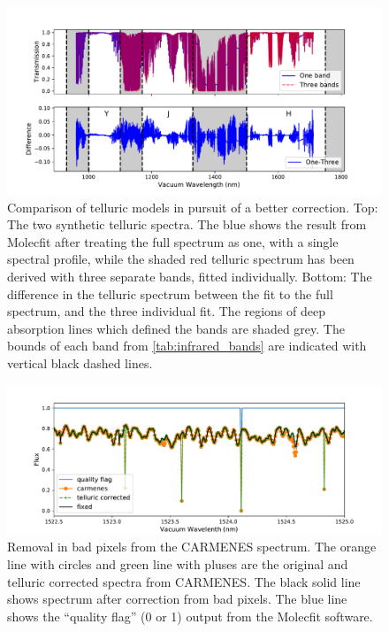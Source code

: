 \begin{figure}
    \centering
    \includegraphics[width=0.9\linewidth]{figures/information-content/Carmenes/compare_telluric_corrections_shaded}
    \caption[]{Comparison of telluric models in pursuit of a better correction.
        Top: The two synthetic telluric spectra.
        The blue shows the result from {Molecfit} after treating the full spectrum as one, with a single spectral profile, while the shaded red telluric spectrum has been derived with three separate bands, fitted individually.
        Bottom: The difference in the telluric spectrum between the fit to the full spectrum, and the three individual fit.
        The regions of deep  absorption lines which defined the \nir{} bands are shaded grey.
        The bounds of each band from \cref{tab:infrared_bands} are indicated with vertical black dashed lines.}
    \label{fig:compare_telluric_corrections}
\end{figure}


\begin{figure}
    \centering
    \includegraphics[width=0.9\linewidth]{figures/information-content/Carmenes/carmenes_spike_removal}
    \caption[Bad pixel removal in {CARMENES}.]{Removal in bad pixels from the {CARMENES} spectrum. The orange line with circles and green line with pluses are the original and telluric corrected spectra from CARMENES.
    The black solid line shows spectrum after correction from bad pixels.
    The blue line shows the ``quality flag'' (0 or 1) output from the Molecfit software.}
    \label{fig:carmenes_spike_removal}
\end{figure}

